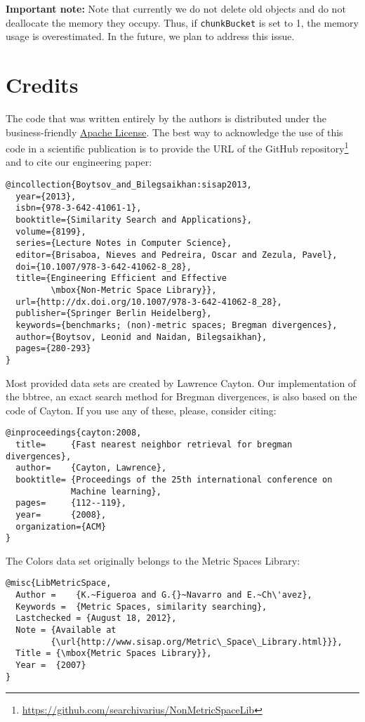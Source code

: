 \documentclass[runningheads,a4paper]{llncs}
\newcommand{\ttt}[1]{\texttt{#1}}
\begin{document}
{\textbf{Important note:}
Note that currently we do not delete old objects and do not deallocate the memory 
they occupy. Thus, 
if 
\ttt{chunkBucket} is set to 1,
the memory usage is overestimated.
In the future, we plan to address this issue.

\section{Credits}\label{SectionCredits}
The code that was written entirely by the authors is distributed 
under the business-friendly \href{http://apache.org/licenses/LICENSE-2.0}{Apache License}. 
The best way to acknowledge the use of this code 
in a scientific publication is to 
provide the URL of the GitHub repository\footnote{\url{https://github.com/searchivarius/NonMetricSpaceLib}} 
and to cite our engineering paper:
\begin{verbatim}
@incollection{Boytsov_and_Bilegsaikhan:sisap2013,
  year={2013},
  isbn={978-3-642-41061-1},
  booktitle={Similarity Search and Applications},
  volume={8199},
  series={Lecture Notes in Computer Science},
  editor={Brisaboa, Nieves and Pedreira, Oscar and Zezula, Pavel},
  doi={10.1007/978-3-642-41062-8_28},
  title={Engineering Efficient and Effective 
         \mbox{Non-Metric Space Library}},
  url={http://dx.doi.org/10.1007/978-3-642-41062-8_28},
  publisher={Springer Berlin Heidelberg},
  keywords={benchmarks; (non)-metric spaces; Bregman divergences},
  author={Boytsov, Leonid and Naidan, Bilegsaikhan},
  pages={280-293}
}
\end{verbatim}


Most provided data sets are created by Lawrence Cayton.
Our implementation of the bbtree, 
an exact search method for Bregman divergences,
is also based on the code of Cayton.
If you use any of these, please, consider citing:
\begin{verbatim}
@inproceedings{cayton:2008,
  title=     {Fast nearest neighbor retrieval for bregman divergences},
  author=    {Cayton, Lawrence},
  booktitle= {Proceedings of the 25th international conference on 
             Machine learning},
  pages=     {112--119},
  year=      {2008},
  organization={ACM}
}
\end{verbatim}

The Colors data set originally belongs to the Metric Spaces Library: 
\begin{verbatim}
@misc{LibMetricSpace, 
  Author =    {K.~Figueroa and G.{}~Navarro and E.~Ch\'avez}, 
  Keywords =  {Metric Spaces, similarity searching}, 
  Lastchecked = {August 18, 2012}, 
  Note = {Available at 
         {\url{http://www.sisap.org/Metric\_Space\_Library.html}}}, 
  Title = {\mbox{Metric Spaces Library}}, 
  Year =  {2007}
} 
\end{verbatim}

}
\end{document}

